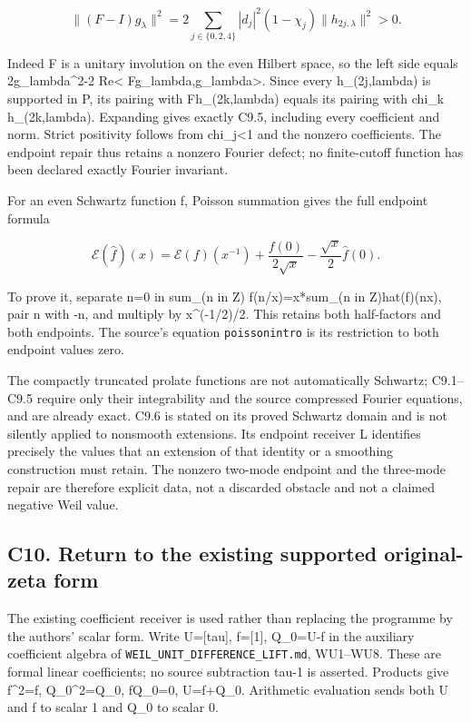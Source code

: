 \documentclass[
]{article}
\begin{document}
\[
\|(F-I)g_\lambda\|^2
=2\sum_{j\in\{0,2,4\}}|d_j|^2(1-\chi_j)
\|h_{2j,\lambda}\|^2>0.
\tag{C9.5}
\]

Indeed F is a unitary involution on the even Hilbert space, so the left
side equals 2\textbar\textbar g\_lambda\textbar\textbar\^{}2-2
Re\textless{} Fg\_lambda,g\_lambda\textgreater. Since every
h\_(2j,lambda) is supported in P, its pairing with Fh\_(2k,lambda)
equals its pairing with chi\_k h\_(2k,lambda). Expanding gives exactly
C9.5, including every coefficient and norm. Strict positivity follows
from chi\_j\textless1 and the nonzero coefficients. The endpoint repair
thus retains a nonzero Fourier defect; no finite-cutoff function has
been declared exactly Fourier invariant.

For an even Schwartz function f, Poisson summation gives the full
endpoint formula

\[
\mathcal E(\widehat f)(x)=\mathcal E(f)(x^{-1})
+\frac{f(0)}{2\sqrt x}-\frac{\sqrt x}{2}\widehat f(0).
\tag{C9.6}
\]

To prove it, separate n=0 in sum\_(n in Z) f(n/x)=x*sum\_(n in
Z)hat(f)(nx), pair n with -n, and multiply by x\^{}(-1/2)/2. This
retains both half-factors and both endpoints. The source's equation
\texttt{poissonintro} is its restriction to both endpoint values zero.

The compactly truncated prolate functions are not automatically
Schwartz; C9.1--C9.5 require only their integrability and the source
compressed Fourier equations, and are already exact. C9.6 is stated on
its proved Schwartz domain and is not silently applied to nonsmooth
extensions. Its endpoint receiver L identifies precisely the values that
an extension of that identity or a smoothing construction must retain.
The nonzero two-mode endpoint and the three-mode repair are therefore
explicit data, not a discarded obstacle and not a claimed negative Weil
value.

\subsection{C10. Return to the existing supported original-zeta
form}\label{c10.-return-to-the-existing-supported-original-zeta-form}

The existing coefficient receiver is used rather than replacing the
programme by the authors' scalar form. Write U={[}tau{]}, f={[}1{]},
Q\_0=U-f in the auxiliary coefficient algebra of
\nolinkurl{WEIL_UNIT_DIFFERENCE_LIFT.md}, WU1--WU8. These are formal linear
coefficients; no source subtraction tau-1 is asserted. Products give
f\^{}2=f, Q\_0\^{}2=Q\_0, fQ\_0=0, U=f+Q\_0. Arithmetic evaluation sends
both U and f to scalar 1 and Q\_0 to scalar 0.
\end{document}
